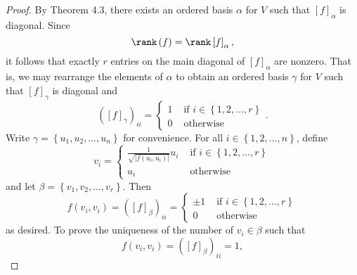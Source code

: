 \documentclass[linearalgebraII]{subfiles}
\begin{document}
    \begin{proof}
        By Theorem 4.3, there exists an ordered basis $\alpha$ for $V$ such that $\left[ f \right] _\alpha$ is diagonal. Since
        \begin{equation*}
            \rank\left( f \right) = \rank\left[ f \right] _\alpha,
        \end{equation*}
        it follows that exactly $r$ entries on the main diagonal of $\left[ f \right] _\alpha$ are nonzero. That is, we may rearrange the elements of $\alpha$ to obtain an ordered basis $\gamma$ for $V$ such that $\left[ f \right] _\gamma$ is diagonal and
        \begin{equation*}
            \left( \left[ f \right] _\gamma \right)_{ii} =
            \begin{cases} 
                1 & \text{ if } i\in \left\lbrace 1,2,\ldots,r \right\rbrace \\ 
                0 & \text{ otherwise }
            \end{cases}.
        \end{equation*}
        Write $\gamma=\left\lbrace u_1,u_2,\ldots,u_n \right\rbrace$ for convenience. For all $i\in\left\lbrace 1,2,\ldots,n \right\rbrace$, define
        \begin{equation*}
            v_i =
            \begin{cases} 
                \frac{1}{\sqrt{\left|f\left( u_i,u_i \right)\right| }}u_i & \text{ if } i\in\left\lbrace 1,2,\ldots,r \right\rbrace \\ 
                u_i & \text{ otherwise }
            \end{cases}
        \end{equation*}
        and let $\beta=\left\lbrace v_1,v_2,\ldots,v_r \right\rbrace$. Then
        \begin{equation*}
            f\left( v_i,v_i \right) = \left( \left[ f \right] _\beta \right) _{ii} = 
            \begin{cases} 
                \pm 1 & \text{ if } i\in\left\lbrace 1,2,\ldots,r \right\rbrace \\ 
                0 & \text{ otherwise }
            \end{cases}
        \end{equation*}
        as desired. To prove the uniqueness of the number of $v_i\in\beta$ such that
        \begin{equation*}
            f\left( v_i,v_i \right) = \left( \left[ f \right] _\beta \right) _{ii} = 1,
        \end{equation*}

\end{proof}
\end{document}
